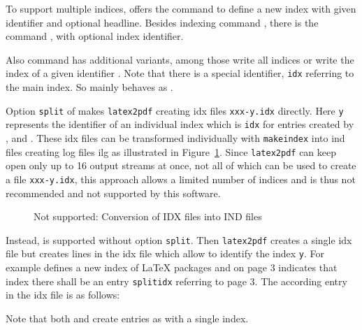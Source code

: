 To support multiple indices, 
 offers the command  
to define a new index with given identifier and optional headline. 
Besides indexing command , 
there is the command , 
with optional index identifier. 

Also command  has additional variants, 
among those write all indices or write the index of a given identifier . 
Note that there is a special identifier, \texttt{idx} referring to the main index. 
So  mainly behaves as . 

Option \texttt{split} of  makes \texttt{latex2pdf} 
creating \gls{idx} files \texttt{xxx-y.idx} directly. 
Here \texttt{y} represents the identifier of an individual index 
which is \texttt{idx} for entries created by 
,  and . 
These \gls{idx} files can be transformed individually with \texttt{makeindex} 
into \gls{ind} files creating log files \gls{ilg} 
as illustrated in Figure~\ref{fig:idx2indMult}. 
Since \texttt{latex2pdf} can keep open only up to 16 output streams at once, 
not all of which can be used to create a file \texttt{xxx-y.idx}, 
this approach allows a limited number of indices 
and is thus not recommended and not supported by this software. 

\begin{figure}[htb]
  \centering
  \caption{\label{fig:idx2indMult}
  Not supported: Conversion of IDX files into IND files}
\end{figure}
  

Instead,  is supported without option \texttt{split}. 
Then \texttt{latex2pdf} creates a single \gls{idx} file 
but  
creates lines  in the \gls{idx} file 
which allow to identify the index \texttt{y}. 
For example  defines a new index of \LaTeX{} packages 
and  on page 3 indicates 
that index there shall be an entry \texttt{splitidx} referring to page 3. 
The according entry in the \gls{idx} file is as follows: 
%
\begin{taglstlisting}[language=TeX]
\end{taglstlisting}
%
Note that both  and  
create entries  as with a single index. 


